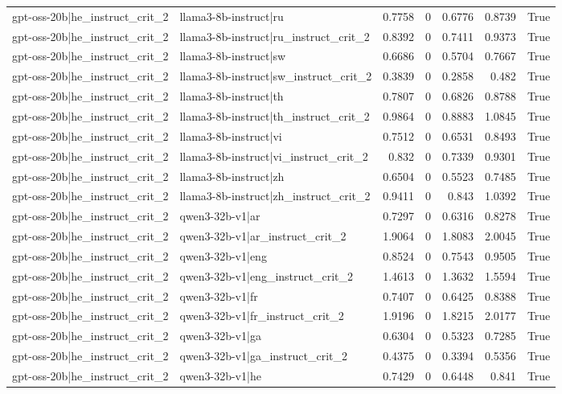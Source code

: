 \begin{table}
\begin{tabular}{l l r r r r l}
gpt-oss-20b|he_instruct_crit_2 & llama3-8b-instruct|ru & 0.7758 & 0 & 0.6776 & 0.8739 & True \\
gpt-oss-20b|he_instruct_crit_2 & llama3-8b-instruct|ru_instruct_crit_2 & 0.8392 & 0 & 0.7411 & 0.9373 & True \\
gpt-oss-20b|he_instruct_crit_2 & llama3-8b-instruct|sw & 0.6686 & 0 & 0.5704 & 0.7667 & True \\
gpt-oss-20b|he_instruct_crit_2 & llama3-8b-instruct|sw_instruct_crit_2 & 0.3839 & 0 & 0.2858 & 0.482 & True \\
gpt-oss-20b|he_instruct_crit_2 & llama3-8b-instruct|th & 0.7807 & 0 & 0.6826 & 0.8788 & True \\
gpt-oss-20b|he_instruct_crit_2 & llama3-8b-instruct|th_instruct_crit_2 & 0.9864 & 0 & 0.8883 & 1.0845 & True \\
gpt-oss-20b|he_instruct_crit_2 & llama3-8b-instruct|vi & 0.7512 & 0 & 0.6531 & 0.8493 & True \\
gpt-oss-20b|he_instruct_crit_2 & llama3-8b-instruct|vi_instruct_crit_2 & 0.832 & 0 & 0.7339 & 0.9301 & True \\
gpt-oss-20b|he_instruct_crit_2 & llama3-8b-instruct|zh & 0.6504 & 0 & 0.5523 & 0.7485 & True \\
gpt-oss-20b|he_instruct_crit_2 & llama3-8b-instruct|zh_instruct_crit_2 & 0.9411 & 0 & 0.843 & 1.0392 & True \\
gpt-oss-20b|he_instruct_crit_2 & qwen3-32b-v1|ar & 0.7297 & 0 & 0.6316 & 0.8278 & True \\
gpt-oss-20b|he_instruct_crit_2 & qwen3-32b-v1|ar_instruct_crit_2 & 1.9064 & 0 & 1.8083 & 2.0045 & True \\
gpt-oss-20b|he_instruct_crit_2 & qwen3-32b-v1|eng & 0.8524 & 0 & 0.7543 & 0.9505 & True \\
gpt-oss-20b|he_instruct_crit_2 & qwen3-32b-v1|eng_instruct_crit_2 & 1.4613 & 0 & 1.3632 & 1.5594 & True \\
gpt-oss-20b|he_instruct_crit_2 & qwen3-32b-v1|fr & 0.7407 & 0 & 0.6425 & 0.8388 & True \\
gpt-oss-20b|he_instruct_crit_2 & qwen3-32b-v1|fr_instruct_crit_2 & 1.9196 & 0 & 1.8215 & 2.0177 & True \\
gpt-oss-20b|he_instruct_crit_2 & qwen3-32b-v1|ga & 0.6304 & 0 & 0.5323 & 0.7285 & True \\
gpt-oss-20b|he_instruct_crit_2 & qwen3-32b-v1|ga_instruct_crit_2 & 0.4375 & 0 & 0.3394 & 0.5356 & True \\
gpt-oss-20b|he_instruct_crit_2 & qwen3-32b-v1|he & 0.7429 & 0 & 0.6448 & 0.841 & True \\

\end{tabular}
\end{table}
